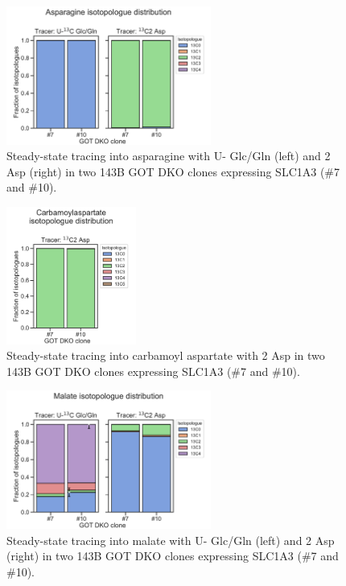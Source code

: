 \begin{figure}[ht]
    \centering
    \includegraphics[width=0.6\textwidth]{figures/sapp/DKO_char/143B_Asn_iso_dist.pdf}
    \caption[\hCi{} Gln/Glc, Asp tracing in 143B GOT DKO, Asn]{
    Steady-state tracing into asparagine with U-\hCi{} Glc/Gln (left) and \hCi{}2 Asp (right) in two 143B GOT DKO clones expressing SLC1A3 (\#7 and \#10).
    }
    \label{fig:sapp:DKO_char:143B_Asn_iso_dist}
\end{figure}

\begin{figure}[ht]
    \centering
    \includegraphics[width=0.38\textwidth]{figures/sapp/DKO_char/143B_CarbAsp_iso_dist.pdf}
    \caption[\hCi{} Asp tracing in 143B GOT DKO, Carbamoyl Asp]{
    Steady-state tracing into carbamoyl aspartate with \hCi{}2 Asp in two 143B GOT DKO clones expressing SLC1A3 (\#7 and \#10).
    }
    \label{fig:sapp:DKO_char:143B_CarbAsp_iso_dist}
\end{figure}

\begin{figure}[ht]
    \centering
    \includegraphics[width=0.6\textwidth]{figures/sapp/DKO_char/143B_Mal_iso_dist.pdf}
    \caption[\hCi{} Gln/Glc, Asp tracing in 143B GOT DKO, Malate]{
    Steady-state tracing into malate with U-\hCi{} Glc/Gln (left) and \hCi{}2 Asp (right) in two 143B GOT DKO clones expressing SLC1A3 (\#7 and \#10).
    }
    \label{fig:sapp:DKO_char:143B_Mal_iso_dist}
\end{figure}





